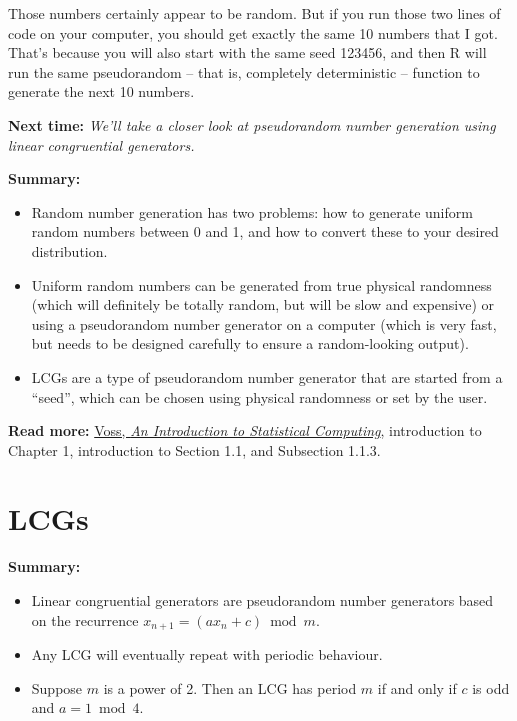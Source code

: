 \documentclass[
  letterpaper,
  DIV=11,
  numbers=noendperiod]{scrreprt}
\theoremstyle{plain}
\theoremstyle{definition}
\theoremstyle{definition}
\theoremstyle{remark}
\begin{document}
Those numbers certainly appear to be random. But if you run those two
lines of code on your computer, you should get exactly the same 10
numbers that I got. That's because you will also start with the same
seed 123456, and then R will run the same pseudorandom -- that is,
completely deterministic -- function to generate the next 10 numbers.

\textbf{Next time:} \emph{We'll take a closer look at pseudorandom
number generation using linear congruential generators.}

\textbf{Summary:}

\begin{itemize}
\item
  Random number generation has two problems: how to generate uniform
  random numbers between 0 and 1, and how to convert these to your
  desired distribution.
\item
  Uniform random numbers can be generated from true physical randomness
  (which will definitely be totally random, but will be slow and
  expensive) or using a pseudorandom number generator on a computer
  (which is very fast, but needs to be designed carefully to ensure a
  random-looking output).
\item
  LCGs are a type of pseudorandom number generator that are started from
  a ``seed'', which can be chosen using physical randomness or set by
  the user.
\end{itemize}

\textbf{Read more:}
\href{https://leeds.primo.exlibrisgroup.com/permalink/44LEE_INST/1fj430b/cdi_askewsholts_vlebooks_9781118728031}{Voss,
\emph{An Introduction to Statistical Computing}}, introduction to
Chapter 1, introduction to Section 1.1, and Subsection 1.1.3.

\chapter{LCGs}\label{lcgs}

\textbf{Summary:}

\begin{itemize}
\item
  Linear congruential generators are pseudorandom number generators
  based on the recurrence \(x_{n+1} = (ax_n + c) \bmod m\).
\item
  Any LCG will eventually repeat with periodic behaviour.
\item
  Suppose \(m\) is a power of 2. Then an LCG has period \(m\) if and
  only if \(c\) is odd and \(a = 1 \bmod 4\).
\end{itemize}
\end{document}
